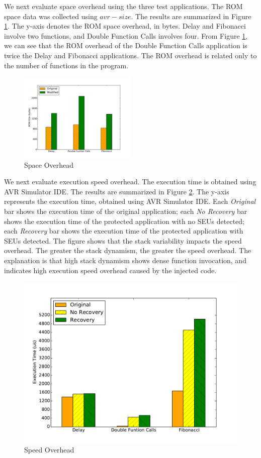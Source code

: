 We next evaluate space overhead using the three test applications. The ROM space data was collected using $avr-size$. The results are summarized in Figure \ref{fig:space_overhead}. The y-axis denotes the ROM space overhead, in bytes. Delay and Fibonacci involve two functions, and Double Function Calls involves four. From Figure \ref{fig:space_overhead}, we can see that the ROM overhead of the Double Function Calls application is twice the Delay and Fibonacci applications. The ROM overhead is related only to the number of functions in the program.
\begin{figure}
\centering
\includegraphics[width=0.5\textwidth]{figures/space_overhead.pdf}
\caption{Space Overhead}
\label{fig:space_overhead}
\end{figure}
We next evaluate execution speed overhead. The execution time is obtained using AVR Simulator IDE. The results are summarized in Figure \ref{fig:speed_overhead}. The y-axis represents the execution time, obtained using AVR Simulator IDE. Each \textit{Original} bar shows the execution time of the original application; each \textit{No Recovery} bar shows the execution time of the protected application with no SEUs detected; each \textit{Recovery} bar shows the execution time of the protected application with SEUs detected. The figure shows that the stack variability impacts the speed overhead. The greater the stack dynamism, the greater the speed overhead. The explanation is that high stack dynamism shows dense function invocation, and indicates high execution speed overhead caused by the injected code.
\begin{figure}
\centering
\includegraphics[scale=0.4]{figures/speed_overhead.pdf}
\caption{Speed Overhead}
\label{fig:speed_overhead}
\end{figure}
